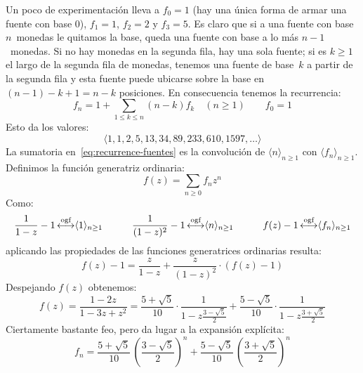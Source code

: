   Un poco de experimentación lleva a \(f_0 = 1\)
  (hay una única forma de armar una fuente con base 0),
  \(f_1 = 1\),
  \(f_2 = 2\)
  y \(f_3 = 5\).
  Es claro que si a una fuente con base \(n\)~monedas
  le quitamos la base,
  queda una fuente con base a lo más \(n - 1\)~monedas.
  Si no hay monedas en la segunda fila,
  hay una sola fuente;
  si es \(k \ge 1\) el largo de la segunda fila de monedas,
  tenemos una fuente de base~\(k\) a partir de la segunda fila
  y esta fuente puede ubicarse sobre la base
  en \((n - 1) - k + 1 = n - k\) posiciones.
  En consecuencia
  tenemos la recurrencia:%
  \begin{equation}
    \label{eq:recurrence-fuentes}
    f_n
      = 1 + \sum_{1 \le k \le n} (n - k) f_k
      \quad (n \ge 1)
      \qquad
      f_0
	= 1
  \end{equation}
  Esto da los valores:
  \begin{equation}
    \label{eq:fountains-sequence}
    \langle 1, 1, 2, 5, 13, 34, 89, 233, 610, 1597, \dotsc \rangle
  \end{equation}
  La sumatoria en~\eqref{eq:recurrence-fuentes}
  es la convolución de \(\langle n \rangle_{n \ge 1}\)
  con \(\langle f_n \rangle_{n \ge 1}\).
  Definimos la función generatriz ordinaria:
  \begin{equation}
    \label{eq:gf-fountain}
    f(z)
      = \sum_{n \ge 0} f_n z^n
  \end{equation}
  Como:
  \begin{equation*}
    \frac{1}{1 - z} - 1
      \operatorname{\stackrel{\text{ogf}}{\longleftrightarrow}} \langle 1 \rangle_{n \ge 1}
    \hspace{3em}
    \frac{1}{(1 - z)^2} - 1
      \operatorname{\stackrel{\text{ogf}}{\longleftrightarrow}} \langle n \rangle_{n \ge 1}
    \hspace{3em}
    f(z) - 1
      \operatorname{\stackrel{\text{ogf}}{\longleftrightarrow}} \langle f_n \rangle_{n \ge 1}
  \end{equation*}
  aplicando las propiedades
  de las funciones generatrices ordinarias resulta:%
  \begin{equation}
    \label{eq:fe-fountains}
    f(z) - 1
      = \frac{z}{1 - z} + \frac{z}{(1 - z)^2} \cdot (f(z) - 1)
  \end{equation}
  Despejando \(f(z)\) obtenemos:
  \begin{equation}
    f(z)
      = \frac{1 - 2 z}{1 - 3 z + z^2}
      = \frac{5 + \sqrt{5}}{10}
	  \cdot \frac{1}{1 - z \frac{3 - \sqrt{5}}{2}}
	+ \frac{5 - \sqrt{5}}{10}
	    \cdot \frac{1}{1 - z \frac{3 + \sqrt{5}}{2}}
		  \label{eq:gf-fountain-pf}
  \end{equation}
  Ciertamente bastante feo,
  pero da lugar a la expansión explícita:
  \begin{equation}
    \label{eq:seq-fountain}
    f_n
      = \frac{5 + \sqrt{5}}{10}
	    \, \left( \frac{3 - \sqrt{5}}{2} \right)^n
	  + \frac{5 - \sqrt{5}}{10}
	      \, \left( \frac{3 + \sqrt{5}}{2} \right)^n
  \end{equation}

